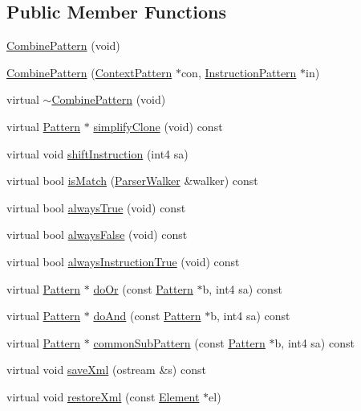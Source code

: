 \subsection*{Public Member Functions}
\begin{DoxyCompactItemize}
\item 
\mbox{\hyperlink{class_combine_pattern_ac3956178a5fd7ae501bae3bc08607565}{Combine\+Pattern}} (void)
\item 
\mbox{\hyperlink{class_combine_pattern_ab61418aafbbfff57b1886964d61b1a17}{Combine\+Pattern}} (\mbox{\hyperlink{class_context_pattern}{Context\+Pattern}} $\ast$con, \mbox{\hyperlink{class_instruction_pattern}{Instruction\+Pattern}} $\ast$in)
\item 
virtual \mbox{\hyperlink{class_combine_pattern_a348fa8ff77bfb2dff97ae5bcca90e299}{$\sim$\+Combine\+Pattern}} (void)
\item 
virtual \mbox{\hyperlink{class_pattern}{Pattern}} $\ast$ \mbox{\hyperlink{class_combine_pattern_ad6eafd26d824e0e449991267f30d818b}{simplify\+Clone}} (void) const
\item 
virtual void \mbox{\hyperlink{class_combine_pattern_a2c69b2e5558a592ff2677c576da440bd}{shift\+Instruction}} (int4 sa)
\item 
virtual bool \mbox{\hyperlink{class_combine_pattern_a89e54d4844001bc9a4916bb643e00fba}{is\+Match}} (\mbox{\hyperlink{class_parser_walker}{Parser\+Walker}} \&walker) const
\item 
virtual bool \mbox{\hyperlink{class_combine_pattern_a2652d809e93e0410daebf2921ad9e04e}{always\+True}} (void) const
\item 
virtual bool \mbox{\hyperlink{class_combine_pattern_a48ba4c275b4c5fad7f06ca4fdd8ef0b5}{always\+False}} (void) const
\item 
virtual bool \mbox{\hyperlink{class_combine_pattern_a681d11a5cb768957162f4d8d647f0aa5}{always\+Instruction\+True}} (void) const
\item 
virtual \mbox{\hyperlink{class_pattern}{Pattern}} $\ast$ \mbox{\hyperlink{class_combine_pattern_acc261bd115b31b7f004d5766702e5412}{do\+Or}} (const \mbox{\hyperlink{class_pattern}{Pattern}} $\ast$b, int4 sa) const
\item 
virtual \mbox{\hyperlink{class_pattern}{Pattern}} $\ast$ \mbox{\hyperlink{class_combine_pattern_aaa5045424b76fd037a192fb4654c7ed8}{do\+And}} (const \mbox{\hyperlink{class_pattern}{Pattern}} $\ast$b, int4 sa) const
\item 
virtual \mbox{\hyperlink{class_pattern}{Pattern}} $\ast$ \mbox{\hyperlink{class_combine_pattern_a161632a4352aed9b12d9a7497d8af681}{common\+Sub\+Pattern}} (const \mbox{\hyperlink{class_pattern}{Pattern}} $\ast$b, int4 sa) const
\item 
virtual void \mbox{\hyperlink{class_combine_pattern_a77f1097e85459ca4ee70dad774df6535}{save\+Xml}} (ostream \&s) const
\item 
virtual void \mbox{\hyperlink{class_combine_pattern_a4d72e9c16ce072982379a9da0bf2ad78}{restore\+Xml}} (const \mbox{\hyperlink{class_element}{Element}} $\ast$el)
\end{DoxyCompactItemize}
